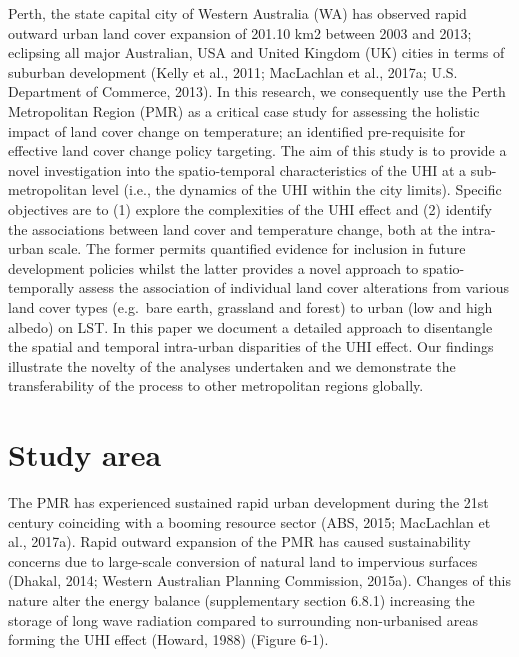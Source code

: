 \documentclass[]{book}
\begin{document}
Perth, the state capital city of Western Australia (WA) has observed
rapid outward urban land cover expansion of 201.10 km2 between 2003 and
2013; eclipsing all major Australian, USA and United Kingdom (UK) cities
in terms of suburban development (Kelly et al., 2011; MacLachlan et al.,
2017a; U.S. Department of Commerce, 2013). In this research, we
consequently use the Perth Metropolitan Region (PMR) as a critical case
study for assessing the holistic impact of land cover change on
temperature; an identified pre-requisite for effective land cover change
policy targeting. The aim of this study is to provide a novel
investigation into the spatio-temporal characteristics of the UHI at a
sub-metropolitan level (i.e., the dynamics of the UHI within the city
limits). Specific objectives are to (1) explore the complexities of the
UHI effect and (2) identify the associations between land cover and
temperature change, both at the intra-urban scale. The former permits
quantified evidence for inclusion in future development policies whilst
the latter provides a novel approach to spatio-temporally assess the
association of individual land cover alterations from various land cover
types (e.g.~bare earth, grassland and forest) to urban (low and high
albedo) on LST. In this paper we document a detailed approach to
disentangle the spatial and temporal intra-urban disparities of the UHI
effect. Our findings illustrate the novelty of the analyses undertaken
and we demonstrate the transferability of the process to other
metropolitan regions globally.

\section{Study area}\label{study-area-1}

The PMR has experienced sustained rapid urban development during the
21st century coinciding with a booming resource sector (ABS, 2015;
MacLachlan et al., 2017a). Rapid outward expansion of the PMR has caused
sustainability concerns due to large-scale conversion of natural land to
impervious surfaces (Dhakal, 2014; Western Australian Planning
Commission, 2015a). Changes of this nature alter the energy balance
(supplementary section 6.8.1) increasing the storage of long wave
radiation compared to surrounding non-urbanised areas forming the UHI
effect (Howard, 1988) (Figure 6-1).
\end{document}
